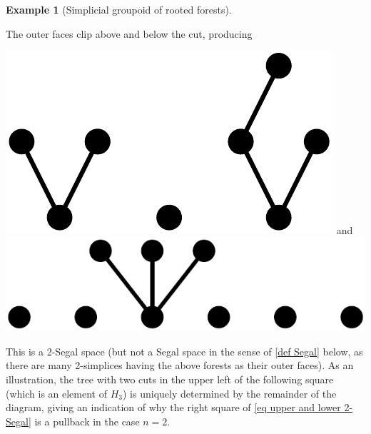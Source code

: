 \documentclass{amsart}
\theoremstyle{definition}
\newtheorem{example}[theorem]{Example}
\theoremstyle{remark}
\begin{document}
\begin{example}[Simplicial groupoid of rooted forests]
\begin{center}
\end{center}
The outer faces clip above and below the cut, producing 
\begin{center}
\includegraphics[scale=0.2]{forest_cut_0.pdf} \qquad and \qquad \includegraphics[scale=0.2]{forest_cut_2.pdf} 
\end{center}
This is a 2-Segal space (but not a Segal space in the sense of \cref{def Segal} below, as there are many 2-simplices having the above forests as their outer faces).
As an illustration, the tree with two cuts in the upper left of the following square (which is an element of $H_3$) is uniquely determined by the remainder of the diagram, giving an indication of why the right square of \eqref{eq upper and lower 2-Segal} is a pullback in the case $n=2$.
\begin{center}
\end{center}
\end{example}
\end{document}
